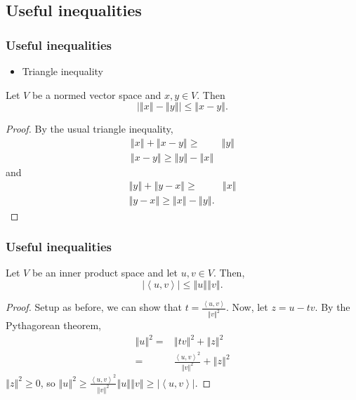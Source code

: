 \documentclass[compress]{beamer}
\newcommand{\iprod}[2]{\left\langle {#1} , {#2} \right\rangle}
\newcommand{\norm}[1]{\left\Vert {#1} \right\Vert}
\begin{document}
\subsection{Useful inequalities}

\begin{frame}
  \frametitle{Useful inequalities}
  \begin{itemize}
  \item Triangle inequality
  \end{itemize}
  \begin{theorem}
    Let $V$ be a normed vector space and $x,y \in V$. Then
    \[ \left| \norm{x} - \norm{y} \right| \leq \norm{x-y}. \]
  \end{theorem}
  \begin{proof}
    By the usual triangle inequality,
    \begin{align*}
      \norm{x} + \norm{x-y} \geq & \norm{y} \\
      \norm{x-y} \geq \norm{y} - \norm{x}
    \end{align*}
    and
    \begin{align*}
      \norm{y} + \norm{y-x} \geq & \norm{x} \\
      \norm{y-x} \geq \norm{x} - \norm{y}.
    \end{align*}
  \end{proof}
\end{frame}
\begin{frame}
  \frametitle{Useful inequalities}
  
  \begin{theorem}
    Let $V$ be an inner product space and let $u,v\in V$. Then,
    \[ \left\vert \iprod{u}{v} \right\vert \leq \norm{u}\norm{v}. \]
  \end{theorem}
  \begin{proof}
    Setup as before, we can show that $t =
    \frac{\iprod{u}{v}}{\norm{v}^2}$. Now, let $z = u-tv$. By the
    Pythagorean theorem,
    \begin{align*}
      \norm{u}^2 = & \norm{tv}^2 + \norm{z}^2 \\
      = & \frac{\iprod{u}{v}^2}{\norm{v}^2} + \norm{z}^2 
    \end{align*}
    $\norm{z}^2\geq 0$, so $
    \norm{u}^2 \geq \frac{\iprod{u}{v}^2}{\norm{v}^2} 
    \norm{u}\norm{v} \geq |\iprod{u}{v}|.$
  \end{proof}
\end{frame}
\end{document}
